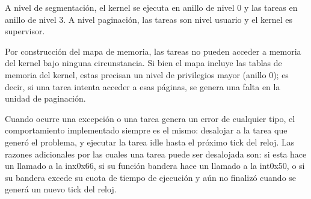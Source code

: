 	A nivel de segmentación, el kernel se ejecuta en anillo de nivel 0 y las tareas 
en anillo de nivel 3. A nivel paginación, las tareas son nivel usuario y el kernel es supervisor.

	Por construcción del mapa de memoria, las tareas no pueden acceder a memoria del 
kernel bajo ninguna circunstancia. Si bien el mapa incluye las tablas de memoria
del kernel, estas precisan un nivel de privilegios mayor (anillo 0); es decir, si una tarea intenta
acceder a esas páginas, se genera una falta en la unidad de paginación.

	Cuando ocurre una excepción o una tarea genera un error de cualquier tipo, el comportamiento 
implementado siempre es el mismo: desalojar a la tarea que generó el problema, y ejecutar la tarea 
idle hasta el próximo tick del reloj. Las razones adicionales por las cuales una tarea puede ser 
desalojada son: si esta hace un llamado a la inx0x66, si su función bandera hace un llamado a la int0x50, 
o si su bandera excede su cuota de tiempo de ejecución y aún no finalizó cuando se generá un nuevo tick del reloj.